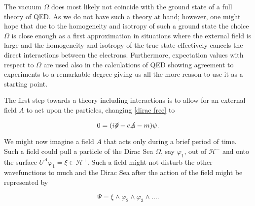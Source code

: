 \documentclass[b5paper,draft,openbib,12pt]{memoir}
\begin{document}
The vacuum \(\Omega\) does most likely not coincide with the 
ground state of a full theory of QED. As we do not have 
such a theory at hand; 
however, one might hope that due to the homogeneity and isotropy 
of such a ground state the choice \(\Omega\) is close enough as a
first approximation in situations where the external field is large 
and the homogeneity and isotropy of the true state 
effectively cancels the direct 
interactions between the electrons.  Furthermore, 
expectation values with respect to \(\Omega\) are 
used also in the
calculations of QED showing agreement to experiments to a remarkable 
degree giving us all the more reason to use it as a starting point. 

The first step towards a theory including interactions is to allow 
for an external field \(A\) to act upon the particles, changing 
\eqref{dirac free} to

\begin{equation}\label{dirac}
  0= (i\slashed{\partial}-e\slashed{A}-m ) \psi.
\end{equation}

We might now imagine a field \(A\) that acts only during a 
brief period of time. Such a field could pull a particle 
of the Dirac Sea \(\Omega\), say 
\(\varphi_1\), out of \(\mathcal{H}^-\) and  
onto the surface \(U^A \varphi_1=\xi \in \mathcal{H}^+\).
Such a field might not disturb the other wavefunctions to much 
and the Dirac Sea after the action of the field might be 
represented by 

\begin{equation}\label{toy example dirac sea}
  \Psi= \xi\wedge \varphi_2\wedge \varphi_3 \wedge \dots.
\end{equation}
\end{document}
